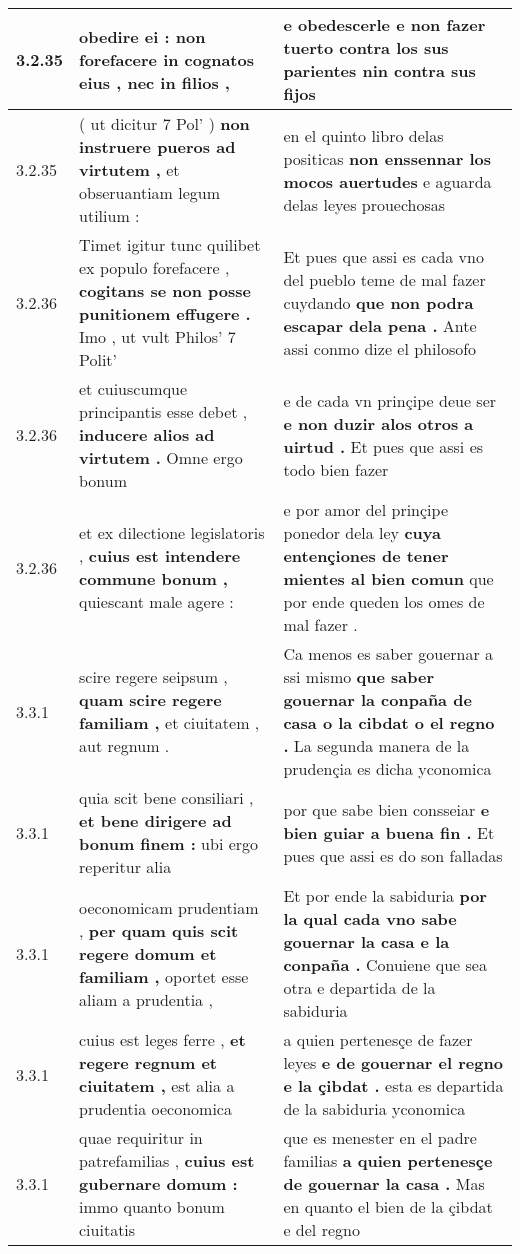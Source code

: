 \begin{tabular}{|p{1cm}|p{6.5cm}|p{6.5cm}|}
3.2.35 & obedire ei : \textbf{ non forefacere in cognatos eius , } nec in filios , & e obedescerle \textbf{ e non fazer tuerto contra los sus parientes } nin contra sus fijos \\\hline
3.2.35 & ( ut dicitur 7 Pol’ ) \textbf{ non instruere pueros ad virtutem , } et obseruantiam legum utilium : & en el quinto libro delas positicas \textbf{ non enssennar los mocos auertudes } e aguarda delas leyes prouechosas \\\hline
3.2.36 & Timet igitur tunc quilibet ex populo forefacere , \textbf{ cogitans se non posse punitionem effugere . } Imo , ut vult Philos’ 7 Polit’ & Et pues que assi es cada vno del pueblo teme de mal fazer cuydando \textbf{ que non podra escapar dela pena . } Ante assi conmo dize el philosofo \\\hline
3.2.36 & et cuiuscumque principantis esse debet , \textbf{ inducere alios ad virtutem . } Omne ergo bonum & e de cada vn prinçipe deue ser \textbf{ e non duzir alos otros a uirtud . } Et pues que assi es todo bien fazer \\\hline
3.2.36 & et ex dilectione legislatoris , \textbf{ cuius est intendere commune bonum , } quiescant male agere : & e por amor del prinçipe ponedor dela ley \textbf{ cuya entençiones de tener mientes al bien comun } que por ende queden los omes de mal fazer . \\\hline
3.3.1 & scire regere seipsum , \textbf{ quam scire regere familiam , } et ciuitatem , aut regnum . & Ca menos es saber gouernar a ssi mismo \textbf{ que saber gouernar la conpaña de casa o la cibdat o el regno . } La segunda manera de la prudençia es dicha yconomica \\\hline
3.3.1 & quia scit bene consiliari , \textbf{ et bene dirigere ad bonum finem : } ubi ergo reperitur alia & por que sabe bien consseiar \textbf{ e bien guiar a buena fin . } Et pues que assi es do son falladas \\\hline
3.3.1 & oeconomicam prudentiam , \textbf{ per quam quis scit regere domum et familiam , } oportet esse aliam a prudentia , & Et por ende la sabiduria \textbf{ por la qual cada vno sabe gouernar la casa e la conpaña . } Conuiene que sea otra e departida de la sabiduria \\\hline
3.3.1 & cuius est leges ferre , \textbf{ et regere regnum et ciuitatem , } est alia a prudentia oeconomica & a quien pertenesçe de fazer leyes \textbf{ e de gouernar el regno e la çibdat . } esta es departida de la sabiduria yconomica \\\hline
3.3.1 & quae requiritur in patrefamilias , \textbf{ cuius est gubernare domum : } immo quanto bonum ciuitatis & que es menester en el padre familias \textbf{ a quien pertenesçe de gouernar la casa . } Mas en quanto el bien de la çibdat e del regno \\\hline

\end{tabular}
